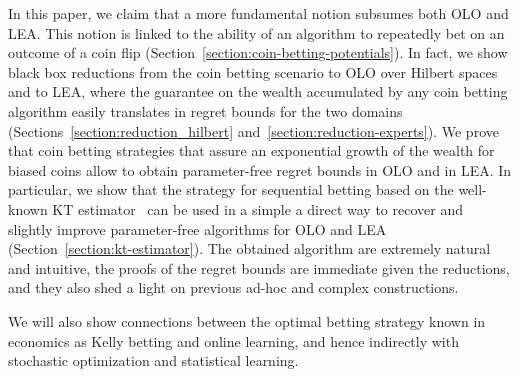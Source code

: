 In this paper, we claim that a more fundamental notion subsumes both \ac{OLO}
and \ac{LEA}. This notion is linked to the ability of an algorithm to repeatedly
bet on an outcome of a coin flip
(Section~\ref{section:coin-betting-potentials}). In fact, we show black box
reductions from the coin betting scenario to \ac{OLO} over Hilbert spaces and to
\ac{LEA}, where the guarantee on the wealth accumulated by any coin betting
algorithm easily translates in regret bounds for the two domains
(Sections~\ref{section:reduction_hilbert} and~\ref{section:reduction-experts}).
We prove that coin betting strategies that assure an exponential growth of the
wealth for biased coins allow to obtain parameter-free regret bounds in \ac{OLO}
and in \ac{LEA}. In particular, we show that the strategy for sequential betting
based on the well-known \ac{KT} estimator~\citep{KrichevskyT81} can be used in a
simple a direct way to recover and slightly improve parameter-free algorithms
for \ac{OLO} and \ac{LEA} (Section~\ref{section:kt-estimator}). The obtained
algorithm are extremely natural and intuitive, the proofs of the regret bounds
are immediate given the reductions, and they also shed a light on previous
ad-hoc and complex constructions.

We will also show connections between the optimal betting strategy known in
economics as Kelly betting \citep{Kelly56} and online learning, and hence
indirectly with stochastic optimization and statistical learning.
